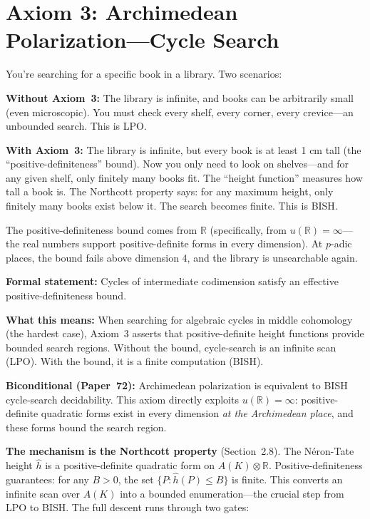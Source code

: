 \documentclass[11pt,twoside,openany]{report}
\theoremstyle{remark}
\newcommand{\BISH}{\textsf{BISH}}
\newcommand{\LPO}{\textsf{LPO}}
\newcommand{\paperref}[1]{\textbf{Paper~#1}}
\begin{document}
\section{Axiom 3: Archimedean Polarization---Cycle Search}

\begin{analogybox}
You're searching for a specific book in a library. Two scenarios:

\textbf{Without Axiom~3:} The library is infinite, and books can be arbitrarily small (even microscopic). You must check every shelf, every corner, every crevice---an unbounded search. This is \LPO.

\textbf{With Axiom~3:} The library is infinite, but every book is at least 1 cm tall (the ``positive-definiteness'' bound). Now you only need to look on shelves---and for any given shelf, only finitely many books fit. The ``height function'' measures how tall a book is. The Northcott property says: for any maximum height, only finitely many books exist below it. The search becomes finite. This is \BISH.

The positive-definiteness bound comes from $\mathbb{R}$ (specifically, from $u(\mathbb{R}) = \infty$---the real numbers support positive-definite forms in every dimension). At $p$-adic places, the bound fails above dimension 4, and the library is unsearchable again.
\end{analogybox}

\textbf{Formal statement:} Cycles of intermediate codimension satisfy an effective positive-definiteness bound.

\textbf{What this means:} When searching for algebraic cycles in middle cohomology (the hardest case), Axiom~3 asserts that positive-definite height functions provide bounded search regions. Without the bound, cycle-search is an infinite scan (\LPO). With the bound, it is a finite computation (\BISH).

\textbf{Biconditional (\paperref{72}):} Archimedean polarization is equivalent to \BISH{} cycle-search decidability. This axiom directly exploits $u(\mathbb{R}) = \infty$: positive-definite quadratic forms exist in every dimension \emph{at the Archimedean place}, and these forms bound the search region.

\textbf{The mechanism is the Northcott property} (Section~2.8). The N\'eron-Tate height $\hat{h}$ is a positive-definite quadratic form on $A(K) \otimes \mathbb{R}$. Positive-definiteness guarantees: for any $B > 0$, the set $\{P : \hat{h}(P) \leq B\}$ is finite. This converts an infinite scan over $A(K)$ into a bounded enumeration---the crucial step from \LPO{} to \BISH. The full descent runs through two gates:
\end{document}
